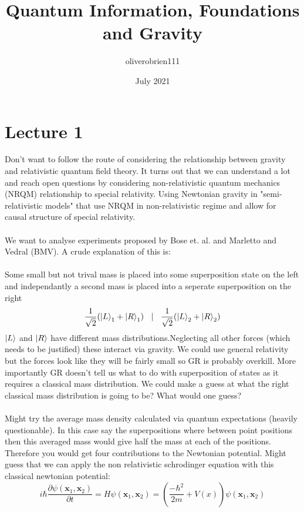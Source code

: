\documentclass{article}
\title{Quantum Information, Foundations and Gravity}
\author{oliverobrien111 }
\date{July 2021}
\begin{document}
\maketitle

\section{Lecture 1}
Don't want to follow the route of considering the relationship between gravity and relativistic quantum field theory. It turns out that we can understand a lot and reach open questions by considering non-relativistic quantum mechanics (NRQM) relationship to special relativity. Using Newtonian gravity in "semi-relativistic models" that use NRQM in non-relativistic regime and allow for causal structure of special relativity.\\\\
We want to analyse experiments proposed by Bose et. al. and Marletto and Vedral (BMV). A crude explanation of this is:\\\\
Some small but not trival mass is placed into some superposition state on the left and independantly a second mass is placed into a seperate superposition on the right
\begin{equation}                \frac{1}{\sqrt{2}}( \ket{L}_1 + \ket{R}_1) \> \> \> \> | \> \> \> \> \frac{1}{\sqrt{2}} ( \ket{L}_2 + \ket{R}_2)
       \end{equation}
       $\ket{L}$ and $\ket{R}$ have different mass distributions.Neglecting all other forces (which needs to be justified) these interact via gravity. We could use general relativity but the forces look like they will be fairly small so GR is probably overkill. More importantly GR doesn't tell us what to do with superposition of states as it requires a classical mass distribution. We could make a guess at what the right classical mass distribution is going to be? What would one guess?\\\\ Might try the average mass density calculated via quantum expectations (heavily questionable). In this case say the superpositions where between point positions then this averaged mass would give half the mass at each of the positions. Therefore you would get four contributions to the Newtonian potential. Might guess that we can apply the non relativistic schrodinger equation with this classical newtonian potential:
       \begin{equation}
               i \hbar \frac{\partial \psi(\bm x_1, \bm x_2)}{\partial t} = H \psi(\bm x_1, \bm x_2) = (\frac{-\hbar^2}{2m} + V(x)) \psi(\bm x_1, \bm x_2)
  
       \end{equation}
\end{document}
